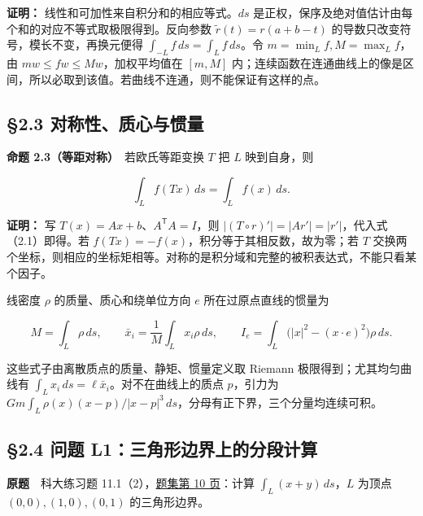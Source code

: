 \documentclass[11pt,a4paper]{article}
\begin{document}
\textbf{证明：} 线性和可加性来自积分和的相应等式。\(ds\)
是正权，保序及绝对值估计由每个和的对应不等式取极限得到。反向参数
\(\widetilde r(t)=r(a+b-t)\) 的导数只改变符号，模长不变，再换元便得
\(\int_{-L}f\,ds=\int_Lf\,ds\)。令 \(m=\min_Lf,M=\max_Lf\)，由
\(mw\le fw\le Mw\)，加权平均值在 \([m,M]\)
内；连续函数在连通曲线上的像是区间，所以必取到该值。若曲线不连通，则不能保证有这样的点。

\subsection{§2.3
对称性、质心与惯量}\label{ux5bf9ux79f0ux6027ux8d28ux5fc3ux4e0eux60efux91cf}

\textbf{命题 2.3（等距对称）}　若欧氏等距变换 \(T\) 把 \(L\)
映到自身，则

\begin{equation*}
 \int_L f(Tx)\,ds=\int_Lf(x)\,ds.\tag{2.4}
\end{equation*}

\textbf{证明：} 写 \(T(x)=Ax+b\)、\(A^{\mathsf T}A=I\)，则
\(|(T\circ r)'|=|Ar'|=|r'|\)，代入式（2.1）即得。若
\(f(Tx)=-f(x)\)，积分等于其相反数，故为零；若 \(T\)
交换两个坐标，则相应的坐标矩相等。对称的是积分域和完整的被积表达式，不能只看某个因子。

线密度 \(\rho\) 的质量、质心和绕单位方向 \(e\) 所在过原点直线的惯量为

\begin{equation*}
 M=\int_L\rho\,ds,\qquad
 \bar x_i=\frac1M\int_Lx_i\rho\,ds,\qquad
 I_e=\int_L\bigl(|x|^2-(x\cdot e)^2\bigr)\rho\,ds.
\end{equation*}

这些式子由离散质点的质量、静矩、惯量定义取 Riemann
极限得到；尤其均匀曲线有
\(\int_Lx_i\,ds=\ell\bar x_i\)。对不在曲线上的质点 \(p\)，引力为
\(Gm\int_L\rho(x)(x-p)/|x-p|^3\,ds\)，分母有正下界，三个分量均连续可积。

\subsection{§2.4 问题
L1：三角形边界上的分段计算}\label{ux95eeux9898-l1ux4e09ux89d2ux5f62ux8fb9ux754cux4e0aux7684ux5206ux6bb5ux8ba1ux7b97}

\textbf{原题}　科大练习题
11.1（2），\href{https://zj139.github.io/math-notes/files/problems/科大数分习题-v2\%282\%29.pdf\#page=10}{题集第
10 页}：计算 \(\int_L(x+y)\,ds\)，\(L\) 为顶点 \((0,0),(1,0),(0,1)\)
的三角形边界。
\end{document}
